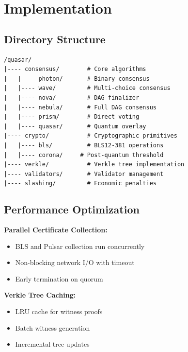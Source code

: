 \section{Implementation}


\subsection{Directory Structure}

\begin{verbatim}
/quasar/
|---- consensus/        # Core algorithms
|   |---- photon/       # Binary consensus
|   |---- wave/         # Multi-choice consensus
|   |---- nova/         # DAG finalizer
|   |---- nebula/       # Full DAG consensus
|   |---- prism/        # Direct voting
|   |---- quasar/       # Quantum overlay
|---- crypto/           # Cryptographic primitives
|   |---- bls/          # BLS12-381 operations
|   |---- corona/     # Post-quantum threshold
|---- verkle/           # Verkle tree implementation
|---- validators/       # Validator management
|---- slashing/         # Economic penalties
\end{verbatim}

\subsection{Performance Optimization}

\textbf{Parallel Certificate Collection:}
\begin{itemize}
\item BLS and Pulsar collection run concurrently
\item Non-blocking network I/O with timeout
\item Early termination on quorum
\end{itemize}

\textbf{Verkle Tree Caching:}
\begin{itemize}
\item LRU cache for witness proofs
\item Batch witness generation
\item Incremental tree updates
\end{itemize}


